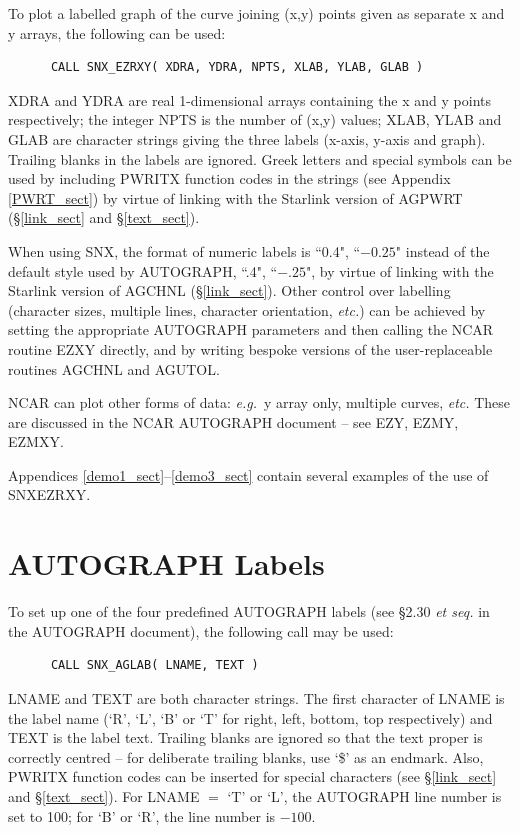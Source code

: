\documentclass[twoside,11pt]{article}
\renewcommand{\_}{\texttt{\symbol{95}}}
\begin{document}
To plot a labelled graph of the curve joining (x,y) points given as separate x
and y arrays, the following can be used:

\begin{verbatim}
      CALL SNX_EZRXY( XDRA, YDRA, NPTS, XLAB, YLAB, GLAB )
\end{verbatim}

XDRA and YDRA are real 1-dimensional arrays containing the x and y points
respectively; the integer NPTS is the number of (x,y) values; XLAB, YLAB and
GLAB are character strings giving the three labels (x-axis, y-axis and graph).
Trailing blanks in the labels are ignored.
Greek letters and special symbols can be used by including PWRITX function
codes in the strings (see Appendix \ref{PWRT_sect}) by virtue of linking with
the Starlink version of AGPWRT (\S\ref{link_sect} and \S\ref{text_sect}).

When using SNX, the format of numeric labels is ``0.4", ``$-0.25$" instead of
the default style used by AUTOGRAPH, ``.4", ``$-.25$", by virtue of linking
with the Starlink version of AGCHNL (\S\ref{link_sect}).
Other control over labelling (character sizes, multiple lines, character
orientation, {\em etc.}) can be achieved by setting the appropriate AUTOGRAPH
parameters and then calling the NCAR routine EZXY directly, and by writing
bespoke versions of the user-replaceable routines AGCHNL and AGUTOL.

NCAR can plot other forms of data: {\em e.g.}\ y array only, multiple curves,
{\em etc.}
These are discussed in the NCAR AUTOGRAPH document -- see EZY, EZMY, EZMXY.

Appendices \ref{demo1_sect}--\ref{demo3_sect} contain several examples of the
use of SNX\_EZRXY.


\section {AUTOGRAPH Labels}

To set up one of the four predefined AUTOGRAPH labels (see \S 2.30 {\em et
seq.} in the AUTOGRAPH document), the following call may be used:

\begin{verbatim}
      CALL SNX_AGLAB( LNAME, TEXT )
\end{verbatim}

LNAME and TEXT are both character strings.
The first character of LNAME is the label name (`R', `L', `B' or `T' for
right, left, bottom, top respectively) and TEXT is the label text.
Trailing blanks are ignored so that the text proper is correctly centred --
for deliberate trailing blanks, use `\$' as an endmark.
Also, PWRITX function codes can be inserted for special characters (see
\S\ref{link_sect} and \S\ref{text_sect}).
For LNAME $=$ `T' or `L', the AUTOGRAPH line number is set to 100; for `B' or
`R', the line number is $-100$.
\end{document}
